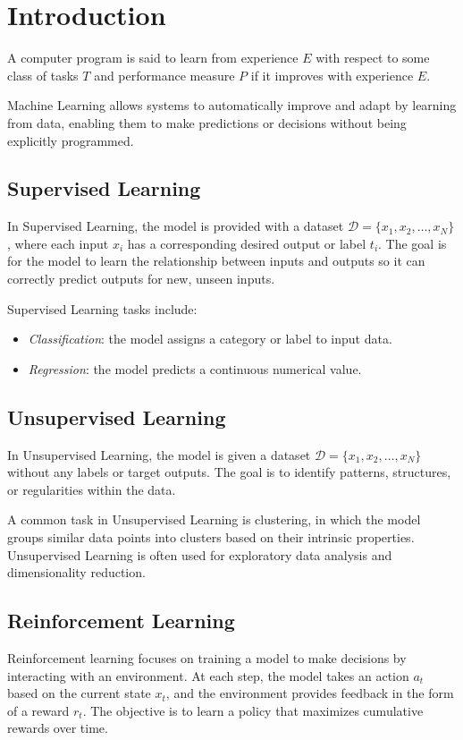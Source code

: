 \section{Introduction}

\begin{definition}
    A computer program is said to learn from experience $E$ with respect to some class of tasks $T$ and performance measure $P$ if it improves with experience $E$. 
\end{definition}
Machine Learning allows systems to automatically improve and adapt by learning from data, enabling them to make predictions or decisions without being explicitly programmed.

\subsection{Supervised Learning}
In Supervised Learning, the model is provided with a dataset $\mathcal{D} = \{x_1, x_2, \dots, x_N\}$, where each input $x_i$ has a corresponding desired output or label $t_i$. 
The goal is for the model to learn the relationship between inputs and outputs so it can correctly predict outputs for new, unseen inputs.

Supervised Learning tasks include:
\begin{itemize} 
    \item \textit{Classification}: the model assigns a category or label to input data.
    \item \textit{Regression}: the model predicts a continuous numerical value. 
\end{itemize} 

\subsection{Unsupervised Learning}
In Unsupervised Learning, the model is given a dataset $\mathcal{D} = \{x_1, x_2, \dots, x_N\}$ without any labels or target outputs.
The goal is to identify patterns, structures, or regularities within the data.

A common task in Unsupervised Learning is clustering, in which the model groups similar data points into clusters based on their intrinsic properties.
Unsupervised Learning is often used for exploratory data analysis and dimensionality reduction.

\subsection{Reinforcement Learning}
Reinforcement learning focuses on training a model to make decisions by interacting with an environment.
At each step, the model takes an action $a_t$ based on the current state $x_t$, and the environment provides feedback in the form of a reward $r_t$. 
The objective is to learn a policy that maximizes cumulative rewards over time.